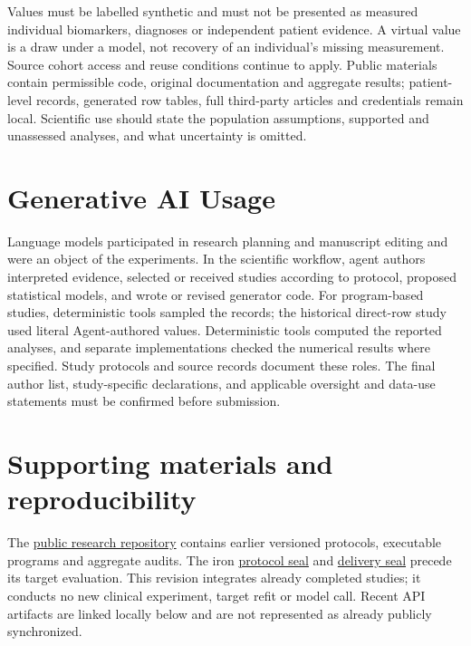 \documentclass[11pt,letterpaper]{article}
\begin{document}
Values must be labelled synthetic and must not be presented as measured individual biomarkers, diagnoses or independent patient evidence. A virtual value is a draw under a model, not recovery of an individual's missing measurement. Source cohort access and reuse conditions continue to apply. Public materials contain permissible code, original documentation and aggregate results; patient-level records, generated row tables, full third-party articles and credentials remain local. Scientific use should state the population assumptions, supported and unassessed analyses, and what uncertainty is omitted.


\section{Generative AI Usage}

Language models participated in research planning and manuscript editing and were an object of the experiments. In the scientific workflow, agent authors interpreted evidence, selected or received studies according to protocol, proposed statistical models, and wrote or revised generator code. For program-based studies, deterministic tools sampled the records; the historical direct-row study used literal Agent-authored values. Deterministic tools computed the reported analyses, and separate implementations checked the numerical results where specified. Study protocols and source records document these roles. The final author list, study-specific declarations, and applicable oversight and data-use statements must be confirmed before submission.


\section*{Supporting materials and reproducibility}

The \href{https://github.com/ziwang11112/evidence-guided-virtual-cohorts-2026}{public research repository} contains earlier versioned protocols, executable programs and aggregate audits. The iron \href{https://github.com/ziwang11112/evidence-guided-virtual-cohorts-2026/commit/bedd845768c1c938768f58fce685f53cbf97f3df}{protocol seal} and \href{https://github.com/ziwang11112/evidence-guided-virtual-cohorts-2026/commit/c88192edeb0bc63b60d0bfe6e3a7282ced9d2975}{delivery seal} precede its target evaluation. This revision integrates already completed studies; it conducts no new clinical experiment, target refit or model call. Recent API artifacts are linked locally below and are not represented as already publicly synchronized.
\end{document}
